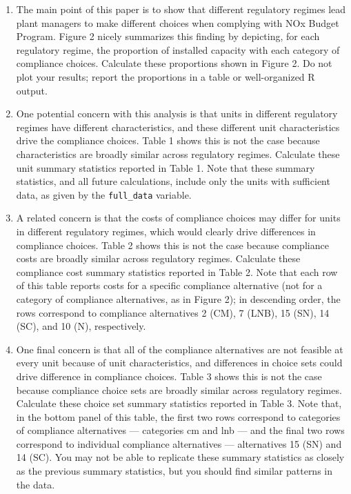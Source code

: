 \documentclass[11pt,letterpaper]{article}
\begin{document}
\begin{enumerate}[label=\alph*., leftmargin=*]
	\item The main point of this paper is to show that different regulatory regimes lead plant managers to make different choices when complying with NOx Budget Program. Figure 2 nicely summarizes this finding by depicting, for each regulatory regime, the proportion of installed capacity with each category of compliance choices. Calculate these proportions shown in Figure 2. Do not plot your results; report the proportions in a table or well-organized R output.

	\item One potential concern with this analysis is that units in different regulatory regimes have different characteristics, and these different unit characteristics drive the compliance choices. Table 1 shows this is not the case because characteristics are broadly similar across regulatory regimes. Calculate these unit summary statistics reported in Table 1. Note that these summary statistics, and all future calculations, include only the units with sufficient data, as given by the \texttt{full\_data} variable.

	\item A related concern is that the costs of compliance choices may differ for units in different regulatory regimes, which would clearly drive differences in compliance choices. Table 2 shows this is not the case because compliance costs are broadly similar across regulatory regimes. Calculate these compliance cost summary statistics reported in Table 2. Note that each row of this table reports costs for a specific compliance alternative (not for a category of compliance alternatives, as in Figure 2); in descending order, the rows correspond to compliance alternatives 2 (CM), 7 (LNB), 15 (SN), 14 (SC), and 10 (N), respectively.

	\item One final concern is that all of the compliance alternatives are not feasible at every unit because of unit characteristics, and differences in choice sets could drive difference in compliance choices. Table 3 shows this is not the case because compliance choice sets are broadly similar across regulatory regimes. Calculate these choice set summary statistics reported in Table 3. Note that, in the bottom panel of this table, the first two rows correspond to categories of compliance alternatives --- categories cm and lnb --- and the final two rows correspond to individual compliance alternatives --- alternatives 15 (SN) and 14 (SC). You may not be able to replicate these summary statistics as closely as the previous summary statistics, but you should find similar patterns in the data.
\end{enumerate}
\end{document}
